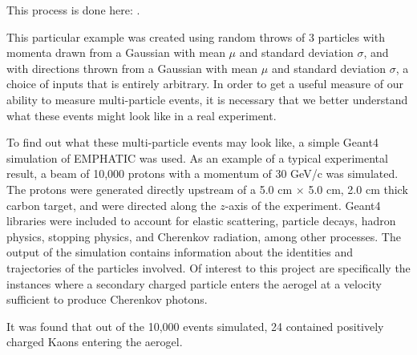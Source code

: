 This process is done here: .

This particular example was created using random throws of 3 particles with momenta drawn from a Gaussian with mean $\mu$ and standard deviation $\sigma$, and with directions thrown from a Gaussian with mean $\mu$ and standard deviation $\sigma$, a choice of inputs that is entirely arbitrary. 
In order to get a useful measure of our ability to measure multi-particle events, it is necessary that we better understand what these events might look like in a real experiment.

To find out what these multi-particle events may look like, a simple Geant4 simulation of EMPHATIC was used.
As an example of a typical experimental result, a beam of 10,000 protons with a momentum of 30 GeV/c was simulated.
The protons were generated directly upstream of a 5.0 cm $\times$ 5.0 cm, 2.0 cm thick carbon target, and were directed along the $z$-axis of the experiment.
Geant4 libraries were included to account for elastic scattering, particle decays, hadron physics, stopping physics, and Cherenkov radiation, among other processes. 
The output of the simulation contains information about the identities and trajectories of the particles involved. 
Of interest to this project are specifically the instances where a secondary charged particle enters the aerogel at a velocity sufficient to produce Cherenkov photons.


It was found that out of the 10,000 events simulated, 24 contained positively charged Kaons entering the aerogel.

\endinput

Any text after an \endinput is ignored.
You could put scraps here or things in progress.
